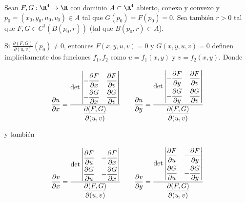 \begin{teo}\label{teo:3.1.3}
    Sean $F, G: \R^4 \rightarrow \R$ con dominio $A \subset \R^4$ abierto, conexo y convexo y $p_0 = (x_0, y_0, u_0, v_0) \in A$ tal que $G(p_0) = F(p_0) = 0$. Sea también $r > 0$ tal que $F, G \in C^1\left( B(p_0, r) \right)$ (tal que $B(p_0, r) \subset A$).
    
    Si $\frac{\partial(F,G)}{\partial(u,v)}(p_0) \neq 0$, entonces $F(x,y,u,v) = 0$ y $G(x,y,u,v) = 0$ definen implícitamente dos funciones $f_1, f_2$ como $u = f_1(x,y)$ y $v = f_2(x,y)$. Donde
    
    \[
    \dfrac{\partial u}{\partial x} = \dfrac{
    \det \renewcommand\arraystretch{2}\begin{vmatrix}
             - \dfrac{\partial F}{\partial x} & \dfrac{\partial F}{\partial v} \\
             - \dfrac{\partial G}{\partial x} & \dfrac{\partial G}{\partial v} \\
         \end{vmatrix}
    }{\dfrac{\partial (F,G)}{\partial (u,v)}}
    \qquad
    \dfrac{\partial u}{\partial y} = \dfrac{
    \det \renewcommand\arraystretch{2}\begin{vmatrix}
             - \dfrac{\partial F}{\partial y} & \dfrac{\partial F}{\partial v} \\
             - \dfrac{\partial G}{\partial y} & \dfrac{\partial G}{\partial v} \\
         \end{vmatrix}
    }{\dfrac{\partial (F,G)}{\partial (u,v)}}
    \]
    
    \noindent y también
    
    \[
    \dfrac{\partial v}{\partial x} = \dfrac{
    \det \renewcommand\arraystretch{2}\begin{vmatrix}
             \dfrac{\partial F}{\partial u} & -\dfrac{\partial F}{\partial x} \\
             \dfrac{\partial G}{\partial u} & -\dfrac{\partial G}{\partial x} \\
         \end{vmatrix}
    }{\dfrac{\partial (F,G)}{\partial (u,v)}}
    \qquad
    \dfrac{\partial v}{\partial y} = \dfrac{
    \det \renewcommand\arraystretch{2}\begin{vmatrix}
             \dfrac{\partial F}{\partial u} & -\dfrac{\partial F}{\partial y} \\
             \dfrac{\partial G}{\partial u} & -\dfrac{\partial G}{\partial y} \\
         \end{vmatrix}
    }{\dfrac{\partial (F,G)}{\partial (u,v)}}
    \]
\end{teo}

